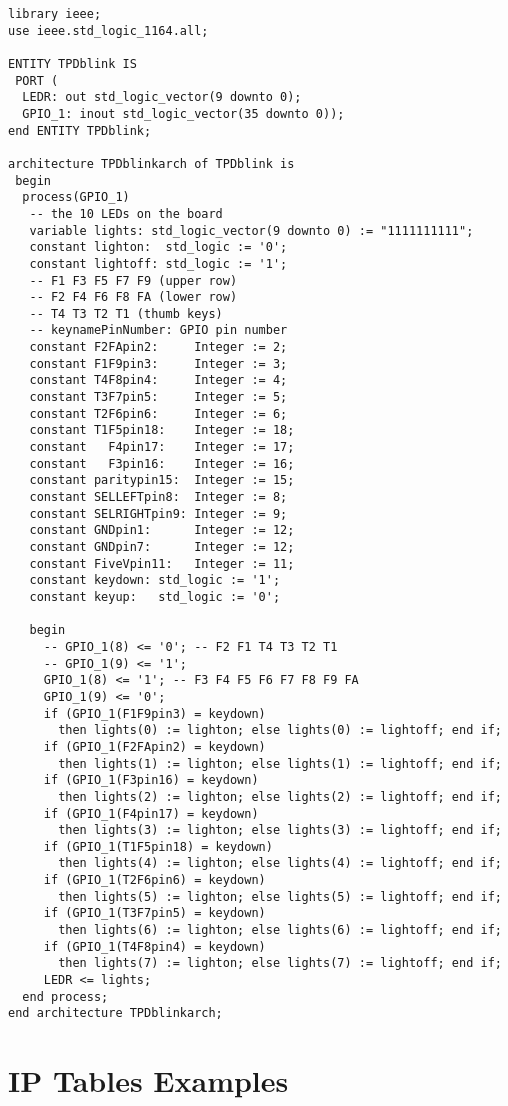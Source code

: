\documentclass[dvipdfm]{book}
\begin{document}
\begin{verbatim}
library ieee;
use ieee.std_logic_1164.all;

ENTITY TPDblink IS 
 PORT (
  LEDR: out std_logic_vector(9 downto 0);
  GPIO_1: inout std_logic_vector(35 downto 0));
end ENTITY TPDblink;

architecture TPDblinkarch of TPDblink is
 begin 
  process(GPIO_1)
   -- the 10 LEDs on the board
   variable lights: std_logic_vector(9 downto 0) := "1111111111";
   constant lighton:  std_logic := '0';
   constant lightoff: std_logic := '1';
   -- F1 F3 F5 F7 F9 (upper row)
   -- F2 F4 F6 F8 FA (lower row)
   -- T4 T3 T2 T1 (thumb keys)
   -- keynamePinNumber: GPIO pin number
   constant F2FApin2:     Integer := 2;
   constant F1F9pin3:     Integer := 3;
   constant T4F8pin4:     Integer := 4;
   constant T3F7pin5:     Integer := 5;
   constant T2F6pin6:     Integer := 6;
   constant T1F5pin18:    Integer := 18;
   constant   F4pin17:    Integer := 17;
   constant   F3pin16:    Integer := 16;
   constant paritypin15:  Integer := 15;
   constant SELLEFTpin8:  Integer := 8;
   constant SELRIGHTpin9: Integer := 9;
   constant GNDpin1:      Integer := 12;
   constant GNDpin7:      Integer := 12;
   constant FiveVpin11:   Integer := 11;
   constant keydown: std_logic := '1';
   constant keyup:   std_logic := '0';

   begin 
     -- GPIO_1(8) <= '0'; -- F2 F1 T4 T3 T2 T1
     -- GPIO_1(9) <= '1';
     GPIO_1(8) <= '1'; -- F3 F4 F5 F6 F7 F8 F9 FA
     GPIO_1(9) <= '0';
     if (GPIO_1(F1F9pin3) = keydown) 
       then lights(0) := lighton; else lights(0) := lightoff; end if;
     if (GPIO_1(F2FApin2) = keydown) 
       then lights(1) := lighton; else lights(1) := lightoff; end if;
     if (GPIO_1(F3pin16) = keydown)
       then lights(2) := lighton; else lights(2) := lightoff; end if;
     if (GPIO_1(F4pin17) = keydown) 
       then lights(3) := lighton; else lights(3) := lightoff; end if;
     if (GPIO_1(T1F5pin18) = keydown)
       then lights(4) := lighton; else lights(4) := lightoff; end if;
     if (GPIO_1(T2F6pin6) = keydown)
       then lights(5) := lighton; else lights(5) := lightoff; end if;
     if (GPIO_1(T3F7pin5) = keydown)
       then lights(6) := lighton; else lights(6) := lightoff; end if;
     if (GPIO_1(T4F8pin4) = keydown)
       then lights(7) := lighton; else lights(7) := lightoff; end if;
     LEDR <= lights;
  end process;
end architecture TPDblinkarch;
\end{verbatim}

\section{IP Tables Examples\cite{9}}
\end{document}
